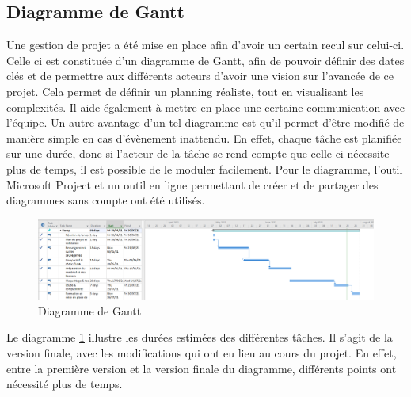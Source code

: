 \documentclass[pfe]{tnreport} %
\begin{document}
\subsection{Diagramme de Gantt}

Une gestion de projet a été mise en place afin d'avoir un certain recul sur celui-ci. \newline
Celle ci est constituée d'un diagramme de Gantt, afin de pouvoir définir des dates clés et de permettre aux différents acteurs d'avoir une vision sur l'avancée de ce projet. \newline
Cela permet de définir un planning réaliste, tout en visualisant les complexités. Il aide également à mettre en place une certaine communication avec l'équipe. \newline
Un autre avantage d'un tel diagramme est qu'il permet d'être modifié de manière simple en cas d'évènement inattendu. En effet, chaque tâche est planifiée sur une durée, donc si l'acteur de la tâche se rend compte que celle ci nécessite plus de temps, il est possible de le moduler facilement. \newline
Pour le diagramme, l'outil Microsoft Project et un outil en ligne permettant de créer et de partager des diagrammes sans compte ont été utilisés.
\begin{figure}[ht]
 \centering
 \includegraphics[width=18cm]{figures/gantt.png}
 \caption{Diagramme de Gantt}
 \label{fig:gantt}
\end{figure}

Le diagramme \ref{fig:gantt} illustre les durées estimées des différentes tâches. Il s'agit de la version finale, avec les modifications qui ont eu lieu au cours du projet. En effet, entre la première version et la version finale du diagramme, différents points ont nécessité plus de temps. 
\end{document}
